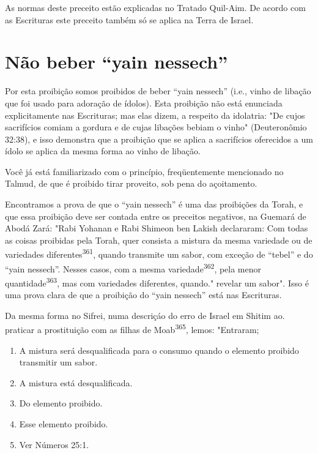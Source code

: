 As normas deste preceito estão explicadas no Tratado Quil-Aim. De acordo
com as Escrituras este preceito também só se aplica na Terra de Israel.

\section{Não beber ``yain nessech''}

Por esta proibição somos proibidos de beber ``yain nessech'' (i.e., vinho
de libação que foi usado para adoração de ídolos). Esta proibição não
está enunciada explicitamente nas Escrituras; mas elas dizem, a respeito
da ido­latria: "De cujos sacrifícios comiam a gordura e de cujas
libações bebiam o vi­nho" (Deuteronômio 32:38), e isso demonstra que a
proibição que se aplica a sacrifícios oferecidos a um ídolo se aplica da
mesma forma ao vinho de libação.

Você já está familiarizado com o princípio, freqüentemente mencio­nado
no Talmud, de que é proibido tirar proveito, sob pena do açoitamento.

Encontramos a prova de que o ``yain nessech'' é uma das proibições da
Torah, e que essa proibição deve ser contada entre os preceitos
negativos, na Guemará de Abodá Zará: "Rabi Yohanan e Rabi Shimeon ben
Lakish decla­raram: Com todas as coisas proibidas pela Torah, quer
consista a mistura da mesma variedade ou de variedades
diferentes\textsuperscript{361}, quando transmite um sabor, com exceção
de ``tebel'' e do ``yain nessech''. Nesses casos, com a mesma
variedade\textsuperscript{362}, pela menor
quantidade\textsuperscript{363}, mas com variedades diferentes,
quan­do." revelar um sabor". Isso é uma prova clara de
que a proibição do ``yain nessech'' está nas Escrituras.

Da mesma forma no Sifrei, numa descriçáo do erro de Israel em Shitim
ao. praticar a prostituição com as filhas de
Moab\textsuperscript{365}, lemos: "Entraram;


\begin{enumerate}
\def\labelenumi{\arabic{enumi}.}
\setcounter{enumi}{360}
\item
 
 A mistura será desqualificada para o consumo quando o elemento
 proibido transmitir um sabor.
 
\item
 
 A mistura está desqualificada.
 
\item
 
 Do elemento proibido.
 
\item
 
 Esse elemento proibido.
 
\item
 
 Ver Números 25:1.
 
\end{enumerate}

